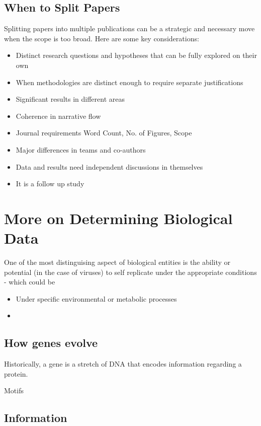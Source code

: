 \documentclass[11pt]{report}
\begin{document}
{\subsection{When to Split Papers}
Splitting papers into multiple publications can be a strategic and necessary move when the scope is too broad.
Here are some key considerations:
\begin{itemize}
	\item Distinct research questions and hypotheses that can be fully explored on their own 
	\item When methodologies are distinct enough to require separate justifications
	\item Significant results in different areas
	\item Coherence in narrative flow
	\item Journal requirements \dotfill Word Count, No. of Figures, Scope
	\item Major differences in teams and co-authors
	\item Data and results need independent discussions in themselves 
	\item It is a follow up study 
\end{itemize}


\section{More on Determining Biological Data}

One of the most distinguising aspect of biological entities is the ability or potential (in the case of viruses) to self replicate under the appropriate conditions - which could be 
\begin{itemize}
	\item Under specific environmental or metabolic processes
	\item 
\end{itemize}


\subsection{How genes evolve}
Historically, a gene is a stretch of DNA that encodes information regarding a protein. 

Motifs 

\subsection{Information}

}
\end{document}
